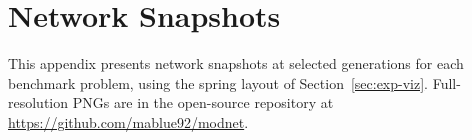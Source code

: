 \chapter{Network Snapshots}
\label{app:snapshots}

This appendix presents network snapshots at selected generations for
each benchmark problem, using the spring layout of
Section~\ref{sec:exp-viz}. Full-resolution PNGs are in the
open-source repository at \url{https://github.com/mablue92/modnet}.

